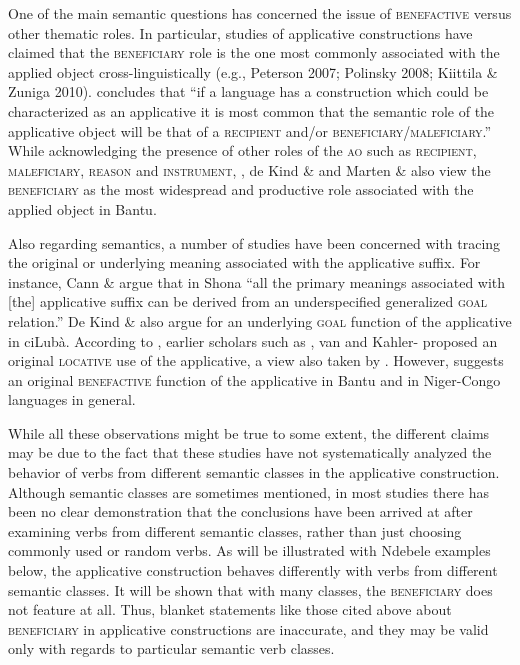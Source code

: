 One of the main semantic questions has concerned the issue of \textsc{benefactive} versus other thematic roles. In particular, studies of applicative constructions have claimed that the \textsc{beneficiary} role is the one most commonly associated with the applied object cross-linguistically (e.g., Peterson 2007; Polinsky 2008; Kiittila \& Zuniga 2010). \citet[40]{Peterson2007} concludes that “if a language has a construction which could be characterized as an applicative it is most common that the semantic role of the applicative object will be that of a \textsc{recipient} and/or \textsc{beneficiary}/\textsc{maleficiary.”} While acknowledging the presence of other roles of the \textsc{ao} such as \textsc{recipient}, \textsc{maleficiary}, \textsc{reason} and \textsc{instrument}, \citet{Schadeberg2003}, de Kind \& \citet[101]{Bostoen2012} and Marten \& \citet[1]{Kula2014} also view the \textsc{beneficiary} as the most widespread and productive role associated with the applied object in Bantu. 

Also regarding semantics, a number of studies have been concerned with tracing the original or underlying meaning associated with the applicative suffix. For instance, Cann \& \citet[3]{Mabhugu2007} argue that in Shona “all the primary meanings associated with [the] applicative suffix can be derived from an underspecified generalized \textsc{goal} relation.” De Kind \& \citet{Bostoen2012} also argue for an underlying \textsc{goal} function of the applicative in ciLubà. According to \citet{Trithart1983}, earlier scholars such as \citet{Endemann1876}, van \citet{Eeden1956} and Kahler-\citet{Mayer1966} proposed an original \textsc{locative} use of the applicative, a view also taken by \citet[74]{Schadeberg2003}. However, \citet[75]{Trithart1983} suggests an original \textsc{benefactive} function of the applicative in Bantu and in Niger-Congo languages in general. 

While all these observations might be true to some extent, the different claims may be due to the fact that these studies have not systematically analyzed the behavior of verbs from different semantic classes in the applicative construction. Although semantic classes are sometimes mentioned, in most studies there has been no clear demonstration that the conclusions have been arrived at after examining verbs from different semantic classes, rather than just choosing commonly used or random verbs. As will be illustrated with Ndebele examples below, the applicative construction behaves differently with verbs from different semantic classes. It will be shown that with many classes, the \textsc{beneficiary} does not feature at all. Thus, blanket statements like those cited above about \textsc{beneficiary} in applicative constructions are inaccurate, and they may be valid only with regards to particular semantic verb classes.

